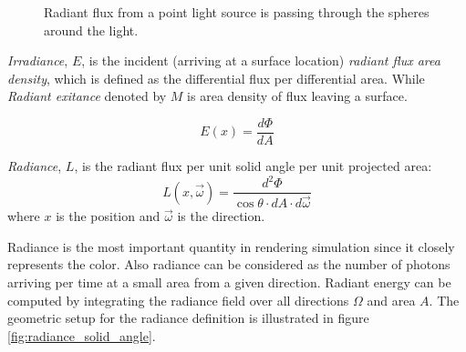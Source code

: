\begin{figure}[htp]
    \centering
    \renewcommand{\thefigure}{\thechapter.\arabic{figure}}
    \caption[Radiant flux of point light source]{Radiant flux from a point light source is passing through the spheres around the light.}
    \label{fig:flux_point_light}
\end{figure}

\emph{Irradiance}, \(E\), is the incident (arriving at a surface location) \emph{radiant flux area density}, which is defined as the differential flux per differential area. While \emph{Radiant exitance} denoted by \(M\) is area density of flux leaving a surface.

\begin{equation}
E(x) = \frac{d\Phi}{dA}
\end{equation}

\emph{Radiance}, \(L\), is the radiant flux per unit solid angle per unit projected area:
\begin{equation}
L(x, \overrightarrow{\omega}) = \frac{d^{2}\Phi}{\cos{\theta} \cdot dA \cdot d\overrightarrow{\omega}}
\end{equation}
where \(x\) is the position and \(\overrightarrow{\omega}\) is the direction.

Radiance is the most important quantity in rendering simulation since it closely represents the color. Also radiance can be considered as the number of photons arriving per time at a small area from a given direction. Radiant energy can be computed by integrating the radiance field over all directions \(\Omega\) and area \(A\). The geometric setup for the radiance definition is illustrated in figure \ref{fig:radiance_solid_angle}.

